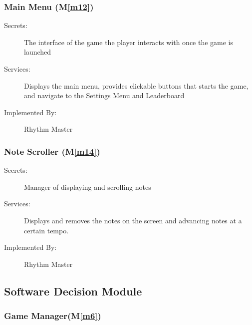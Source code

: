 \documentclass[12pt, titlepage]{article}
\newcommand{\mref}[1]{M\ref{#1}}
\begin{document}
\subsubsection{Main Menu (\mref{m12})}

\begin{description}
\item[Secrets:] The interface of the game the player interacts with once the game is launched
\item[Services:] Displays the main menu, provides clickable buttons that starts the game, and navigate to the Settings Menu and Leaderboard
\item[Implemented By:] Rhythm Master
\end{description}

\subsubsection{Note Scroller (\mref{m14})}

\begin{description}
\item[Secrets:] Manager of displaying and scrolling notes 
\item[Services:] Displays and removes the notes on the screen and advancing notes at a certain tempo.
\item[Implemented By:] Rhythm Master
\end{description}

\subsection{Software Decision Module}


\subsubsection{Game Manager(\mref{m6})}
\end{document}
